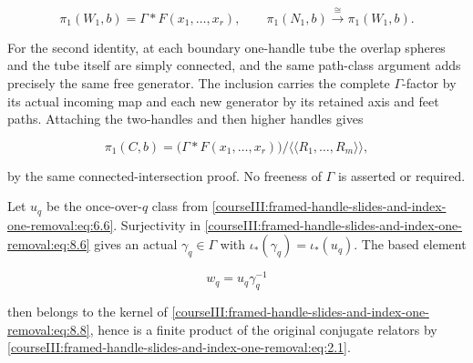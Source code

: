 \begin{equation}
\pi_1(W_1,b)=\Gamma*F(x_1,\ldots,x_r),\qquad
 \pi_1(N_1,b)\xrightarrow{\cong}\pi_1(W_1,b).
 \label{courseIII:framed-handle-slides-and-index-one-removal:eq:8.7}
\end{equation}

For the second identity, at each boundary one-handle tube the overlap spheres and the tube itself are simply connected, and the same path-class argument adds precisely the same free generator. The inclusion carries the complete \(\Gamma\)-factor by its actual incoming map and each new generator by its retained axis and feet paths. Attaching the two-handles and then higher handles gives

\begin{equation}
\pi_1(C,b)=
 \bigl(\Gamma*F(x_1,\ldots,x_r)\bigr)/
           \langle\!\langle R_1,\ldots,R_m\rangle\!\rangle,
 \label{courseIII:framed-handle-slides-and-index-one-removal:eq:8.8}
\end{equation}

by the same connected-intersection proof. No freeness of \(\Gamma\) is asserted or required.

Let \(u_q\) be the once-over-\(q\) class from \eqref{courseIII:framed-handle-slides-and-index-one-removal:eq:6.6}. Surjectivity in \eqref{courseIII:framed-handle-slides-and-index-one-removal:eq:8.6} gives an actual \(\gamma_q\in\Gamma\) with
\(\iota_*(\gamma_q)=\iota_*(u_q)\).
The based element

\begin{equation}
w_q=u_q\gamma_q^{-1}
 \label{courseIII:framed-handle-slides-and-index-one-removal:eq:8.9}
\end{equation}

then belongs to the kernel of \eqref{courseIII:framed-handle-slides-and-index-one-removal:eq:8.8}, hence is a finite product of the original conjugate relators by \eqref{courseIII:framed-handle-slides-and-index-one-removal:eq:2.1}.

